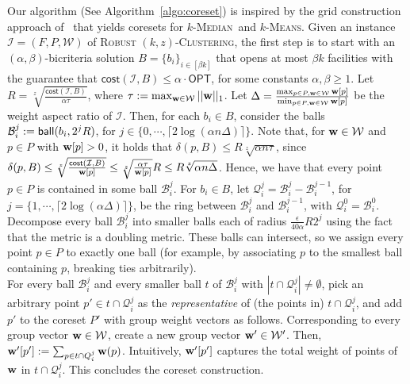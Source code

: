 \documentclass[11pt]{article}
\newcommand{\opt}{\ensuremath{\textsf{OPT}}}
\newcommand{\cost}{\ensuremath{\textsf{cost}}}
\newcommand{\ball}{{\sf ball}}
\newcommand{\km}{\textsc{$k$-Median}\xspace}
\newcommand{\kmns}{\textsc{$k$-Means}\xspace}
\newcommand{\rkc}{\textsc{Robust $(k,z)$-Clustering}\xspace}
\newcommand{\vecw}{{\bf w}\xspace}
\newcommand{\cB}{\ensuremath{\mathcal{B}}\xspace}
\newcommand{\cI}{\ensuremath{\mathcal{I}}\xspace}
\newcommand{\cQ}{\ensuremath{\mathcal{Q}}\xspace}
\newcommand{\cW}{\ensuremath{\mathcal{W}}\xspace}
\begin{document}
Our algorithm (See Algorithm~\ref{algo:coreset}) is inspired by the grid construction approach of~\cite{10.1145/1007352.1007400} that yields coresets for \km\ and \kmns. %
Given an instance $\cI=(F,P,\cW)$ of \rkc, the first step is to start with an $(\alpha,\beta)$-bicriteria solution $B=\{b_i\}_{i \in [\beta k]}$ that opens at most $\beta k$ facilities with the guarantee that $\cost({\cI},B) \le \alpha \cdot \opt$, for some constants $\alpha,\beta \ge 1$. Let $R = \sqrt[z]{\frac{\cost({\cI},B)}{\alpha \tau}}$, where $\tau := \max_{\vecw \in \cW} ||\vecw||_1$.
Let $\Delta = \frac{\max_{p \in P, \vecw \in \cW} \vecw[p]}{\min_{p \in P, \vecw \in \cW} \vecw[p]}$ be the weight aspect ratio of $\cI$. 
Then, for each $b_i \in B$, 
consider the balls $\cB^j_i := \ball(b_i,2^j R)$, for $j \in \{0,\cdots, \lceil 2 \log(\alpha n \Delta) \rceil\}$. Note that, for $\vecw \in \cW$ and $p\in P$ with $\vecw[p]>0$, it holds that $\delta(p,B) \le R\sqrt[z]{\alpha n \tau}$, since $\delta(p,B) \le \sqrt[z]{\frac{\cost({\cI},B)}{\vecw[p]}} \le \sqrt[z]{\frac{\alpha\tau}{\vecw[p]}}R \le R\sqrt[z]{\alpha n \Delta}$.
Hence, we have that every point $p \in P$ is contained in some ball $\cB^j_i$. 
For $b_i \in B$, let $\cQ^j_i = \cB^j_i - \cB^{j-1}_i$, for $j= \{1,\cdots, \lceil 2 \log(\alpha \Delta) \rceil\}$, be the ring between $\cB^j_i$ and $\cB^{j-1}_i$, with $\cQ^0_i = \cB^0_i$.
Decompose every ball $\cB^j_i$ into smaller balls each of radius $\frac{\epsilon }{40 \alpha}R 2^j$ using the fact that the metric is a doubling metric.
These balls can intersect, so we assign  every point $p \in P$ to exactly one ball (for example, by associating $p$ to the smallest ball containing $p$, breaking ties arbitrarily).\\
For every ball $\cB^j_i$ and every smaller ball $t$ of $\cB^j_i$ with $|t \cap \cQ^j_i| \ne \emptyset$, pick an arbitrary point $p' \in t \cap \cQ^j_i$ as the \emph{representative} of (the points in) $t\cap \cQ^j_i$, and add $p'$ to the coreset $P'$ with group weight vectors as follows. Corresponding to every group vector $\vecw \in \cW$, create a new group vector $\vecw' \in \cW'$. Then,$
\vecw'[p'] := \sum_{p \in t \cap Q^j_i} \vecw(p)$.
Intuitively, $\vecw'[p']$ captures the total weight of points of $\vecw$ in $t \cap \cQ^j_i$. This concludes the coreset construction.
\end{document}
